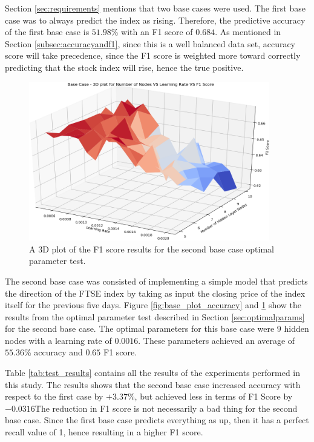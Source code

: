 \documentclass{UoYCSproject}
\begin{document}
Section \ref{sec:requirements} mentions that two base cases were used. The first base case was to always predict the index as rising. Therefore, the predictive accuracy of the first base case is $51.98$\% with an F1 score of $0.684$. As mentioned in Section \ref{subsec:accuracyandf1}, since this is a well balanced data set, accuracy score will take precedence, since the F1 score is weighted more toward correctly predicting that the stock index will rise, hence the true positive.

\begin{figure}[h]
\includegraphics[width=10.5cm]{base_f1.png}
\centering
\caption{A 3D plot of the F1 score results for the second base case optimal parameter test.} 
\label{fig:base_plot_f1}
\end{figure}

The second base case was consisted of implementing a simple model that predicts the direction of the FTSE index by taking as input the closing price of the index itself for the previous five days. Figure \ref{fig:base_plot_accuracy} and \ref{fig:base_plot_f1} show the results from the optimal parameter test described in Section \ref{sec:optimalparams} for the second base  case. The optimal parameters for this base case were $9$ hidden nodes with a learning rate of $0.0016$. These parameters achieved an average of $55.36$\% accuracy and $0.65$ F1 score.

Table \ref{tab:test_results} contains all the results of the experiments performed in this study. The results shows that the second base case increased accuracy with respect to the first case by $+3.37$\%, but achieved less in terms of F1 Score by $-0.0316$\. The reduction in F1 score is not necessarily a bad thing for the second base case. Since the first base case predicts everything as up, then it has a perfect recall value of 1, hence resulting in a higher F1 score. 
\end{document}

